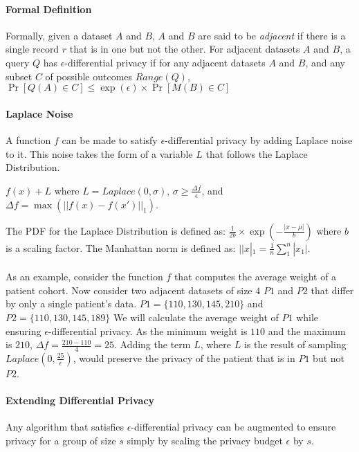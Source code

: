 \paragraph{Formal Definition}
Formally, given a dataset $A$ and $B$, $A$ and $B$ are said to be \textit{adjacent} if there is a single record $r$ that is in one but not the other. For adjacent datasets $A$ and $B$, a query $Q$ has $\epsilon$-differential privacy if for any adjacent datasets $A$ and $B$, and any subset $C$ of possible outcomes $Range(Q)$, $\Pr[Q(A) \in C] \leq \exp(\epsilon) \times \Pr[M(B) \in C]$

\paragraph{Laplace Noise}
A function $f$ can be made to satisfy $\epsilon$-differential privacy by adding Laplace noise to it. This noise takes the form of a variable $L$ that follows the Laplace Distribution. 

$f(x) + L$ where $L = Laplace(0, \sigma)$, $\sigma \geq \frac{\Delta f}{\epsilon}$, and $\Delta f = \max(||f(x) - f(x')||_1)$.

The PDF for the Laplace Distribution is defined as: $\frac{1}{2b} \times \exp(-\frac{|x - \mu|}{b})$ where $b$ is a scaling factor. The Manhattan norm is defined as: $||x|_1 = \frac{1}{n} \sum_1^n |x_1|$.

\paragraph{}

As an example, consider the function $f$ that computes the average weight of a patient cohort. Now consider two adjacent datasets of size $4$ $P1$ and $P2$ that differ by only a single patient's data. $P1 = \{110, 130, 145, 210\}$ and $P2 = \{110, 130, 145, 189\}$ We will calculate the average weight of $P1$ while ensuring $\epsilon$-differential privacy. As the minimum weight is $110$ and the maximum is $210$, $\Delta f = \frac{210 - 110}{4} = 25$. Adding the term $L$, where $L$ is the result of sampling $Laplace(0, \frac{25}{\epsilon})$, would preserve the privacy of the patient that is in $P1$ but not $P2$.

\paragraph{Extending Differential Privacy}

Any algorithm that satisfies $\epsilon$-differential privacy can be augmented to ensure privacy for a group of size $s$ simply by scaling the privacy budget $\epsilon$ by $s$.

